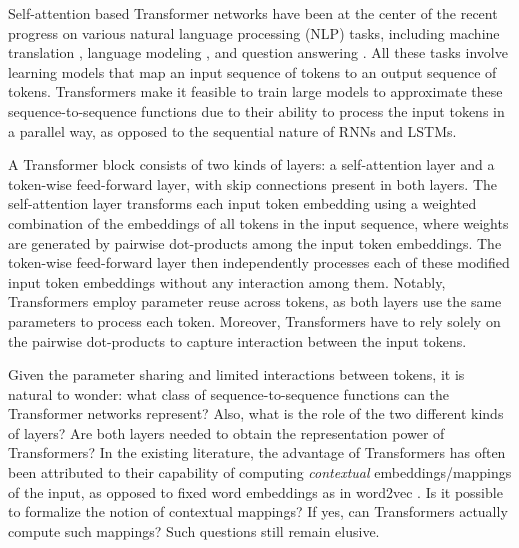 \documentclass{article} %
\begin{document}
Self-attention based Transformer networks \citep{vaswani2017attention} have been at the center of the recent progress on various natural language processing (NLP) tasks, including machine translation \citep{vaswani2017attention}, language modeling \citep{radford2018gpt,radford2019gpt2}, and question answering \citep{devlin2018bert, xlnet2019, roberta2019}. %
All these tasks involve learning models that map an input sequence of tokens to an output sequence of tokens. Transformers make it feasible to train large models to approximate these sequence-to-sequence functions due to their ability to process the input tokens in a parallel way, as opposed to the sequential %
nature of RNNs and LSTMs.


A Transformer block consists of two kinds of layers: a self-attention layer and a token-wise feed-forward layer, with skip connections present in both layers. The self-attention layer transforms each input token embedding using a weighted combination of the embeddings of all tokens in the input sequence,
where weights are generated by pairwise dot-products among the input token embeddings. The token-wise feed-forward layer then independently processes each of these modified input token embeddings without any interaction among them. 
Notably, Transformers employ parameter reuse across tokens, as both layers use the same parameters to process each token.
Moreover, Transformers have to rely solely on the pairwise dot-products to capture interaction between the input tokens.

Given the parameter sharing and limited interactions between tokens, it is natural to wonder: what class of sequence-to-sequence functions can the Transformer networks represent? Also, what is the role of the two different kinds of layers? Are both layers needed to obtain the representation power of Transformers? 
In the existing literature, the advantage of Transformers has often been attributed to their capability of computing \textit{contextual} embeddings/mappings of the input, as opposed to fixed word embeddings as in word2vec \citep{mikolov2013distributed}. Is it possible to formalize the notion of contextual mappings? If yes,
can Transformers actually compute such mappings? Such questions still remain elusive.
\end{document}
